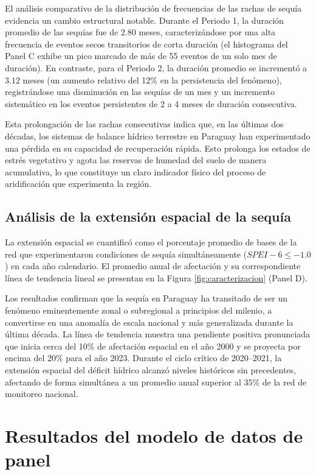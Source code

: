 El análisis comparativo de la distribución de frecuencias de las rachas de sequía evidencia un cambio estructural notable. Durante el Periodo 1, la duración promedio de las sequías fue de $2.80$ meses, caracterizándose por una alta frecuencia de eventos secos transitorios de corta duración (el histograma del Panel C exhibe un pico marcado de más de 55 eventos de un solo mes de duración). En contraste, para el Periodo 2, la duración promedio se incrementó a $3.12$ meses (un aumento relativo del 12\% en la persistencia del fenómeno), registrándose una disminución en las sequías de un mes y un incremento sistemático en los eventos persistentes de 2 a 4 meses de duración consecutiva.

Esta prolongación de las rachas consecutivas indica que, en las últimas dos décadas, los sistemas de balance hídrico terrestre en Paraguay han experimentado una pérdida en su capacidad de recuperación rápida. Esto prolonga los estados de estrés vegetativo y agota las reservas de humedad del suelo de manera acumulativa, lo que constituye un claro indicador físico del proceso de aridificación que experimenta la región.

\subsection{Análisis de la extensión espacial de la sequía}

La extensión espacial se cuantificó como el porcentaje promedio de bases de la red que experimentaron condiciones de sequía simultáneamente ($SPEI-6 \leq -1.0$) en cada año calendario. El promedio anual de afectación y su correspondiente línea de tendencia lineal se presentan en la Figura \ref{fig:caracterizacion} (Panel D).

Los resultados confirman que la sequía en Paraguay ha transitado de ser un fenómeno eminentemente zonal o subregional a principios del milenio, a convertirse en una anomalía de escala nacional y más generalizada durante la última década. La línea de tendencia muestra una pendiente positiva pronunciada que inicia cerca del 10\% de afectación espacial en el año 2000 y se proyecta por encima del 20\% para el año 2023. Durante el ciclo crítico de 2020--2021, la extensión espacial del déficit hídrico alcanzó niveles históricos sin precedentes, afectando de forma simultánea a un promedio anual superior al 35\% de la red de monitoreo nacional.

\section{Resultados del modelo de datos de panel}

